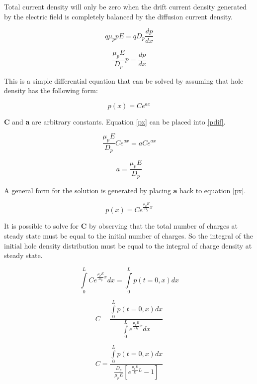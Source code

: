 \begin{doublespace}
Total current density will only be zero when the drift current density generated by the electric field is completely balanced by the diffusion current density.

\begin{equation}
q \mu_{p} p E=qD_{p} \frac{dp}{dx}
\end{equation}

\begin{equation}
 \frac{\mu_{p} E}{D_{p}} p  = \frac{dp}{dx}
 \label{pdif}
\end{equation}

This is a simple differential equation that can be solved by assuming that hole density has the following form:

\begin{equation}
p(x)=Ce^{ax}
\label{px}
\end{equation}

\textbf{C} and \textbf{a} are arbitrary constants. Equation \eqref{px} can be placed into \eqref{pdif}.

\begin{equation}
 \frac{\mu_{p} E}{D_{p}} Ce^{ax}  = a Ce^{ax}
\end{equation}

\begin{equation}
a=\frac{\mu_{p} E}{D_{p}}
\end{equation}

 A general form for the solution is generated by placing \textbf{a} back to equation \eqref{px}.
 
\begin{equation}
p(x)=Ce^{\frac{\mu_{p} E}{D_{p}}x}
\end{equation}

It is possible to solve for \textbf{C} by observing that the total number of charges at steady state must be equal to the initial number of charges. So the integral of the initial hole density distribution must be equal to the integral of charge density at steady state.


\begin{equation}\nonumber
\int\limits_{0}^{L}Ce^{\frac{\mu_{p} E}{D_{p}}x}dx=\int\limits_{0}^{L}p(t=0,x)dx
\end{equation}

\begin{equation}\nonumber
C=\frac{\int\limits_{0}^{L}p(t=0,x)dx}{\int\limits_{0}^{L}e^{\frac{\mu_{p} E}{D_{p}}x}dx}
\end{equation}

\begin{equation}
C=\frac{\int\limits_{0}^{L}p(t=0,x)dx}{\frac{D_p}{\mu_p E}[e^{\frac{\mu_p E}{D} L} -1]}
\end{equation}


\end{doublespace}
